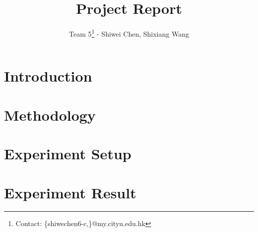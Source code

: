 \documentclass{article}
\title{Project Report}
\author{Team 5\footnote{Contact: \{shiwechen6-c,\}@my.cityu.edu.hk}  \:- Shiwei Chen, Shixiang Wang}
\begin{document}
\maketitle

\section{Introduction}
\section{Methodology}
\section{Experiment Setup}
\section{Experiment Result}

\begin{thebibliography}{00}

\end{thebibliography}
\end{document}
